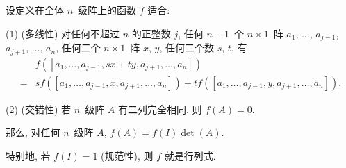 \begin{theorem}
    设定义在全体 \(n\)~级阵上的函数 \(f\) 适合:

    (1)
    (多线性)
    对任何不超过 \(n\) 的正整数 \(j\),
    任何 \(n-1\)~个 \(n \times 1\)~阵
    \(a_1\), \(\dots\), \(a_{j-1}\),
    \(a_{j+1}\), \(\dots\), \(a_n\),
    任何二个 \(n \times 1\)~阵 \(x\), \(y\),
    任何二个数 \(s\), \(t\),
    有
    \begin{align*}
             & f
            {([a_1, \dots, a_{j-1}, sx + ty,
                        a_{j+1}, \dots, a_n])}
        \\
        = {} &
        s
        f {([a_1, \dots, a_{j-1}, x, a_{j+1}, \dots, a_n])}
        +
        t
        f {([a_1, \dots, a_{j-1}, y, a_{j+1}, \dots, a_n])}.
    \end{align*}

    (2)
    (交错性)
    若 \(n\)~级阵 \(A\) 有二列完全相同,
    则 \(f {(A)} = 0\).

    那么, 对任何 \(n\)~级阵 \(A\),
    \(f(A) = f(I) \det {(A)}\).

    特别地, 若 \(f(I) = 1\) (规范性),
    则 \(f\) 就是行列式.
\end{theorem}

